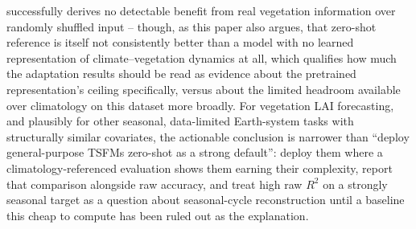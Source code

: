 \documentclass[11pt]{article}
\begin{document}
successfully derives no detectable benefit from real vegetation information over randomly shuffled
input -- though, as this paper also argues,
that zero-shot reference is itself not consistently better than a model with no learned
representation of climate--vegetation dynamics at all, which qualifies how much the adaptation
results should be read as evidence about the pretrained representation's ceiling specifically,
versus about the limited headroom available over climatology on this dataset more broadly. For
vegetation LAI forecasting, and plausibly for other seasonal, data-limited Earth-system tasks with
structurally similar covariates, the actionable conclusion is narrower than ``deploy general-purpose
TSFMs zero-shot as a strong default'': deploy them where a climatology-referenced evaluation shows
them earning their complexity, report that comparison alongside raw accuracy, and treat
high raw $R^2$ on a strongly seasonal target as a question about seasonal-cycle reconstruction
until a baseline this cheap to compute has been ruled out as the explanation.



\end{document}
